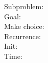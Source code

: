 \begin{frame}{}
  \begin{description}
	\item[Subproblem:]
	\item[Goal:] 
	  \pause
	\item[Make choice:] 
	\item[Recurrence:] 
	  \pause
	\item[Init:]
	\item[Time:] 
  \end{description}
\end{frame}
